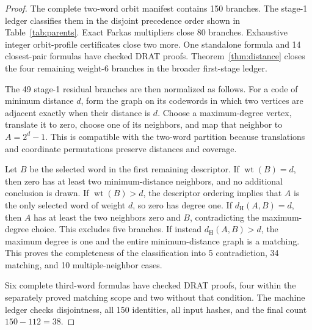 \documentclass[11pt]{article}
\theoremstyle{definition}
\theoremstyle{remark}
\newcommand{\dist}{d_{\mathrm H}}
\begin{document}
\begin{proof}
The complete two-word orbit manifest contains 150 branches.  The
stage-1 ledger classifies them in the disjoint precedence order shown
in Table~\ref{tab:parents}.  Exact Farkas multipliers close 80 branches.
Exhaustive integer orbit-profile certificates close two more.  One
standalone formula and 14 closest-pair formulas have checked DRAT
proofs.  Theorem~\ref{thm:distance} closes the four remaining
weight-6 branches in the broader first-stage ledger.

The 49 stage-1 residual branches are then normalized as follows.  For a
code of minimum distance $d$, form the graph on its codewords in which
two vertices are adjacent exactly when their distance is $d$.  Choose a
maximum-degree vertex, translate it to zero, choose one of its neighbors,
and map that neighbor to $A=2^d-1$.  This is compatible with the
two-word partition because translations and coordinate permutations
preserve distances and coverage.

Let $B$ be the selected word in the first remaining descriptor.  If
$\operatorname{wt}(B)=d$, then zero has at least two minimum-distance
neighbors, and no additional conclusion is drawn.  If
$\operatorname{wt}(B)>d$, the descriptor ordering implies that $A$ is
the only selected word of weight $d$, so zero has degree one.  If
$\dist(A,B)=d$, then $A$ has at least the two neighbors zero and $B$,
contradicting the maximum-degree choice.  This excludes five branches.
If instead $\dist(A,B)>d$, the maximum degree is one and the entire
minimum-distance graph is a matching.  This proves the completeness of
the classification into 5 contradiction, 34 matching, and 10
multiple-neighbor cases.

Six complete third-word formulas have checked DRAT proofs, four within
the separately proved matching scope and two without that condition.
The machine ledger checks disjointness, all 150 identities, all input
hashes, and the final count $150-112=38$.
\end{proof}
\end{document}

